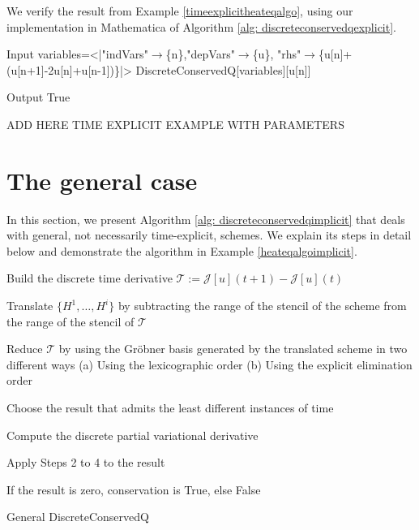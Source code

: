 \documentclass[runningheads]{llncs}
\newcommand{\Rr}{\mathbb{R}}
\newcommand{\Nn}{\mathbb{N}}
\newcommand{\1}{\chi}
\newcommand{\Ii}{\mathcal{I}}
\begin{document}
\begin{example}
	\label{heatex1}
	We verify the result from Example \ref{timeexplicitheateqalgo}, using our implementation in {\sc Mathematica} of Algorithm \ref{alg: discreteconservedqexplicit}.
	
	\begin{small}
		\begin{mmaCell}[moredefined={variables, expression, DiscreteConservedQ}]{Input}
  variables=<|"indVars"\(\pmb{\to}\)\{n\},"depVars"\(\pmb{\to}\)\{u\},
  "rhs"\(\pmb{\to}\)\{u[n]+(u[n+1]-2u[n]+u[n-1])\}|>
  DiscreteConservedQ[variables][u[n]]
  
\end{mmaCell}
		\begin{mmaCell}{Output}
  True
\end{mmaCell}
	\end{small}
\end{example}

{\color{red}ADD HERE TIME EXPLICIT EXAMPLE WITH PARAMETERS} 



\section{The general case}
\label{secgen}
In this section, we present Algorithm \ref{alg: discreteconservedqimplicit} that deals with general, not necessarily time-explicit, schemes. We explain its steps in detail below and demonstrate the algorithm in Example \ref{heateqalgoimplicit}.
\begin{algorithm}
	\DontPrintSemicolon
	\KwIn{$\mathcal{J}\in\mathcal{F}(\mathcal{P}(\Ii\times\Nn,\Rr^m),\mathcal{D}(\Nn))$ and $\{H^1,\ldots,H^i\}\subset\mathcal{S}(\mathcal{P}(\Ii\times\Nn,\Rr^m),\mathcal{P}(\Ii\times\Nn,\Rr))$ }
	
	\label{step1} Build the discrete time derivative $\mathcal{T}:=\mathcal{J}[u](t+1)-\mathcal{J}[u](t)$\;
	
	\label{step2}Translate $\{H^1,\ldots,H^i\}$ by subtracting the range of the stencil of the scheme from the range of the stencil of $\mathcal{T}$\;
	
	\label{step3} Reduce $\mathcal{T}$ by using {\color{red} the Gr{\"o}bner basis} generated by the translated scheme in two different ways
	\label{step3a} (a) Using the lexicographic order
	\label{step3b} (b) Using the explicit elimination order\;
	
	\label{step4} Choose the result that admits the least different instances of time\;
	
	\label{step5} Compute the discrete partial variational derivative\;
	
	\label{step6} Apply Steps 2 to 4 to the result\;
	
	\label{step7} If the result is zero, conservation is {\sc True}, else {\sc False}\;
	
	\caption{{\sc General DiscreteConservedQ}}
	\label{alg: discreteconservedqimplicit}
\end{algorithm}
\end{document}
